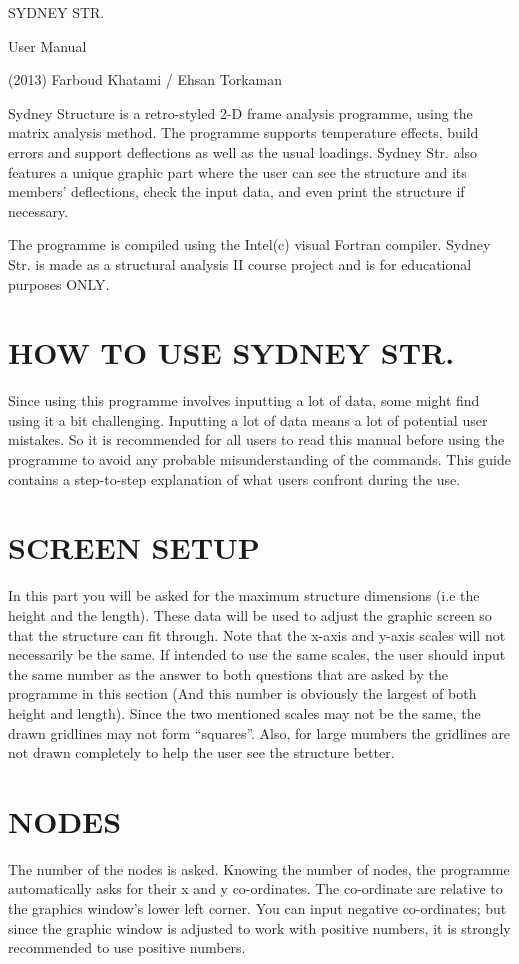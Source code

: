 \documentclass{article}
\begin{document}
\centerline{\sc \large SYDNEY STR.}
\vspace{.5pc}
\centerline{\sc \large User Manual}
\centerline{\sc  \large (2013)  Farboud Khatami / Ehsan Torkaman}
\vspace{2pc}

Sydney Structure is a retro-styled 2-D frame analysis programme, using the matrix analysis method. The programme supports temperature effects, build errors and support deflections as well as the usual loadings. Sydney Str. also features a unique graphic part where the user can see the structure and its members’ deflections, check the input data, and even print the structure if necessary.

The programme is compiled using the Intel(c) visual Fortran compiler. Sydney Str. is made as a structural analysis II course project and is for educational purposes ONLY. 
       
\section{HOW TO USE SYDNEY STR. }
Since using this programme involves inputting a lot of data, some might find using it a bit challenging. Inputting a lot of data means a lot of potential user mistakes. So it is recommended for all users to read this manual before using the programme to avoid any probable misunderstanding of the commands.
	This guide contains a step-to-step explanation of what users confront during the use.
\section{SCREEN SETUP}
In this part you will be asked for the maximum structure dimensions (i.e the height and the length). These data will be used to adjust the graphic screen so that the structure can fit through. Note that the x-axis and y-axis scales will not necessarily be the same. If intended to use the same scales, the user should input the same number as the answer to both questions that are asked by the programme in this section (And this number is obviously the largest of both height and length).
Since the two mentioned scales may not be the same, the drawn gridlines may not form “squares”. Also, for large mumbers the gridlines are not drawn completely to help the user see the structure better.
\section{NODES}
The number of the nodes is asked. Knowing the number of nodes, the programme automatically asks for their x and y co-ordinates. The co-ordinate are relative to the graphics window’s lower left corner. You can input negative co-ordinates; but since the graphic window is adjusted to work with positive numbers, it is strongly recommended to use positive numbers.
	
\end{document}
